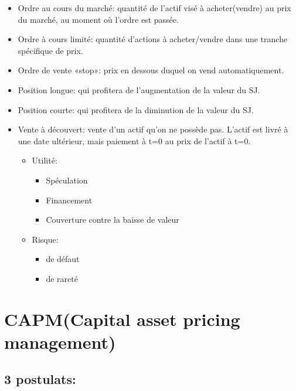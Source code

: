 \begin{itemize}

\item
  Ordre au cours du marché: quantité de l'actif visé à acheter(vendre)
  au prix du marché, au moment où l'ordre est passée.
\item
  Ordre à cours limité: quantité d'actions à acheter/vendre dans une
  tranche spécifique de prix.
\item
  Ordre de vente «stop»: prix en dessous duquel on vend automatiquement.
\item
  Position longue: qui profitera de l'augmentation de la valeur du SJ.
\item
  Position courte: qui profitera de la diminution de la valeur du SJ.
\item
  Vente à découvert: vente d'un actif qu'on ne possède pas. L'actif est
  livré à une date ultérieur, mais paiement à t=0 au prix de l'actif à
  t=0.

  \begin{itemize}
  
  \item
    Utilité:

    \begin{itemize}
    
    \item
      Spéculation
    \item
      Financement
    \item
      Couverture contre la baisse de valeur
    \end{itemize}
  \item
    Risque:

    \begin{itemize}
    
    \item
      de défaut
    \item
      de rareté
    \end{itemize}
  \end{itemize}
\end{itemize}

\section{CAPM(Capital asset pricing management)}\label{capmcapital-asset-pricing-management}

\subsection*{3 postulats:}\label{postulats}

